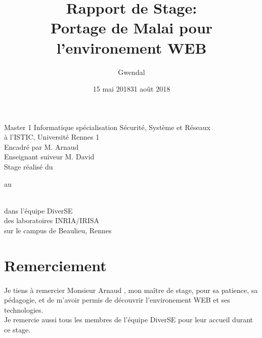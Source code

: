 \documentclass[11pt, a4paper, pdftex]{article}
\begin{document}
    \title{Rapport de Stage: \\ Portage de Malai pour l'environement WEB}
    \author{Gwendal }

    \maketitle
    \thispagestyle{empty}
    \begin{center}
        \vspace{0.25cm} Master 1 Informatique spécialisation Sécurité, Système et Réseaux \\ à l'ISTIC, Université Rennes 1 \\
        \vspace{0.25cm} Encadré par M. Arnaud  \\
        \vspace{0.25cm} Enseignant suiveur M. David  \\
        \vspace{0.25cm} Stage réalisé du \date{15 mai 2018} au \date{31 août 2018} \\ \vspace{0.25cm} dans l'équipe DiverSE \\ des laboratoires INRIA/IRISA \\ sur le campus de Beaulieu, Rennes
    \end{center}


    \newpage
    \setcounter{page}{1}
    \pagestyle{fancy}
    \renewcommand{\headrulewidth}{1pt}
    \fancyhead[C]{\leftmark}
    \fancyfoot[C]{\thepage/\pageref{LastPage}}
    \section*{Remerciement}\label{sec:remerciement}
    \paragraph{}
    Je tiens à remercier Monsieur Arnaud , mon maître de stage, pour sa patience, sa pédagogie, et de m'avoir permis de découvrir l'environement WEB et ses technologies. \\
    Je remercie aussi tous les membres de l'équipe DiverSE pour leur accueil durant ce stage.
    \newpage
\end{document}
